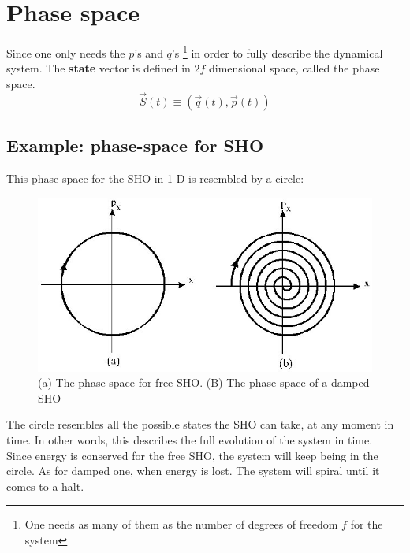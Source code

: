      \section{Phase space}
     Since one only needs the $p$'s and $q$'s \footnote{ One needs as many of them as the number of degrees of freedom $f$ for the system} in order to fully describe the dynamical system. The \textbf{state} vector is defined in $2f$ dimensional space, called the phase space. 
    \begin{equation}
    \vec{S}(t) \equiv (\vec{q}(t), \vec{p}(t))
    \end{equation}
    \subsection{ Example: phase-space for SHO}
    This phase space for the SHO in 1-D is resembled by a circle:
    \begin{figure}[h!]
    	\centering
    	\includegraphics[scale=.4]{./figures/sho}
    	\caption{(a) The phase space for free SHO. (B) The phase space of a damped SHO}
    \end{figure}
    The circle resembles all the possible states the SHO can take, at any moment in time. In other words, this describes the full evolution of the system in time.\\Since energy is conserved for the free SHO, the system will keep being in the circle. As for damped one, when energy is lost. The system will spiral until it comes to a halt. 
